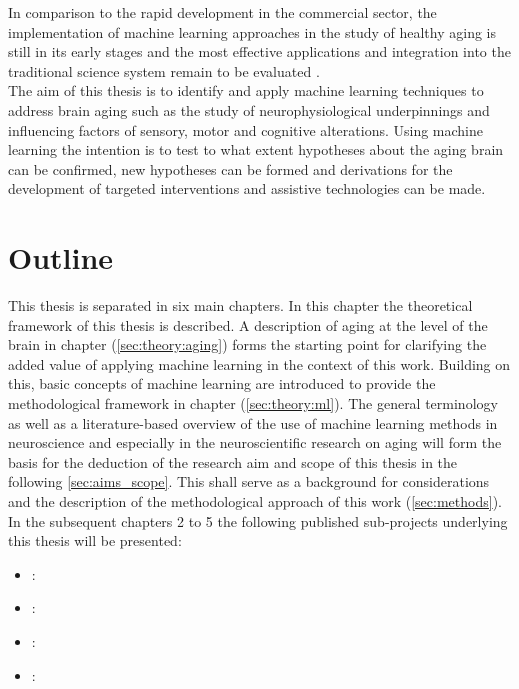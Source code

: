 In comparison to the rapid development in the commercial sector, the implementation of machine learning approaches in the study of healthy aging is still in its early stages and the most effective applications and integration into the traditional science system remain to be evaluated \cite{Bzdok2019}.\\
The aim of this thesis is to identify and apply machine learning techniques to address brain aging such as the study of neurophysiological underpinnings and influencing factors of sensory, motor and cognitive alterations. Using machine learning the intention is to test to what extent hypotheses about the aging brain can be confirmed, new hypotheses can be formed and derivations for the development of targeted interventions and assistive technologies can be made.

\section{Outline}
This thesis is separated in six main chapters. In this chapter the theoretical framework of this thesis is described. A description of aging at the level of the brain in chapter (\autoref{sec:theory:aging}) forms the starting point for clarifying the added value of applying machine learning in the context of this work. Building on this, basic concepts of machine learning are introduced to provide the methodological framework in chapter (\autoref{sec:theory:ml}). The general terminology as well as a literature-based overview of the use of machine learning methods in neuroscience and especially in the neuroscientific research on aging will form the basis for the deduction of the research aim and scope of this thesis in the following \autoref{sec:aims_scope}. This shall serve as a background for considerations and the description of the methodological approach of this work (\autoref{sec:methods}). In the subsequent chapters 2 to 5 the following published sub-projects underlying this thesis will be presented:
\begin{itemize}
\item {}:\\ 
\item {}:\\ 
\item {}:\\ 
\item {}:\\ 
\end{itemize}
